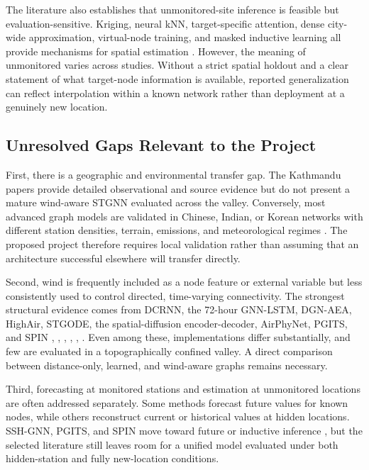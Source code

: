 The literature also establishes that unmonitored-site inference is feasible but evaluation-sensitive. Kriging, neural kNN, target-specific attention, dense city-wide approximation, virtual-node training, and masked inductive learning all provide mechanisms for spatial estimation \cite{ref26,ref27,ref28,ref29,ref30,ref31,ref32}. However, the meaning of unmonitored varies across studies. Without a strict spatial holdout and a clear statement of what target-node information is available, reported generalization can reflect interpolation within a known network rather than deployment at a genuinely new location.

\subsection{Unresolved Gaps Relevant to the Project}

First, there is a geographic and environmental transfer gap. The Kathmandu papers provide detailed observational and source evidence but do not present a mature wind-aware STGNN evaluated across the valley. Conversely, most advanced graph models are validated in Chinese, Indian, or Korean networks with different station densities, terrain, emissions, and meteorological regimes \cite{ref13,ref14,ref15,ref16,ref17,ref18,ref19,ref20,ref21,ref22,ref23,ref24,ref25,ref26,ref27,ref28,ref29,ref30,ref31,ref32,ref33,ref34}. The proposed project therefore requires local validation rather than assuming that an architecture successful elsewhere will transfer directly.

Second, wind is frequently included as a node feature or external variable but less consistently used to control directed, time-varying connectivity. The strongest structural evidence comes from DCRNN, the 72-hour GNN-LSTM, DGN-AEA, HighAir, STGODE, the spatial-diffusion encoder-decoder, AirPhyNet, PGITS, and SPIN \cite{ref14}, \cite{ref15}, \cite{ref17}, \cite{ref22,ref23,ref24,ref25}, \cite{ref31}, \cite{ref32}. Even among these, implementations differ substantially, and few are evaluated in a topographically confined valley. A direct comparison between distance-only, learned, and wind-aware graphs remains necessary.

Third, forecasting at monitored stations and estimation at unmonitored locations are often addressed separately. Some methods forecast future values for known nodes, while others reconstruct current or historical values at hidden locations. SSH-GNN, PGITS, and SPIN move toward future or inductive inference \cite{ref30,ref31,ref32}, but the selected literature still leaves room for a unified model evaluated under both hidden-station and fully new-location conditions.

